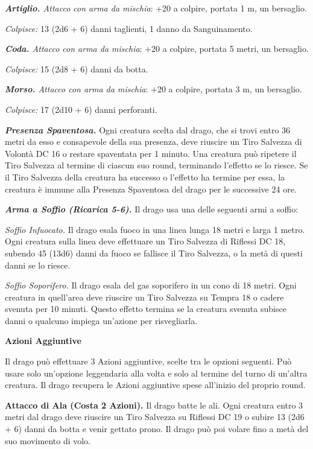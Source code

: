 \begin{multicols}{2}
\textit{\textbf{Artiglio.} Attacco con arma da mischia}: +20 a colpire, portata 1 m, un bersaglio.

\textit{Colpisce:} 13 (2d6 + 6) danni taglienti, 1 danno da Sanguinamento.

\textit{\textbf{Coda.} Attacco con arma da mischia}: +20 a colpire, portata 5 metri, un bersaglio.

\textit{Colpisce:} 15 (2d8 + 6) danni da botta.

\textit{\textbf{Morso.} Attacco con arma da mischia}: +20 a colpire, portata 3 m, un bersaglio.

\textit{Colpisce:} 17 (2d10 + 6) danni perforanti.

\textit{\textbf{Presenza Spaventosa.}} Ogni creatura scelta dal drago, che si trovi entro 36 metri da esso e consapevole della sua presenza, deve riuscire un Tiro Salvezza di Volontà DC 16 o restare spaventata per 1 minuto. Una creatura può ripetere il Tiro Salvezza al termine di ciascun suo round, terminando l'effetto se lo riesce. Se il Tiro Salvezza della creatura ha successo o l'effetto ha termine per essa, la creatura è immune alla Presenza Spaventosa del drago per le successive 24 ore.

\textit{\textbf{Arma a Soffio (Ricarica 5-6).}} Il drago usa una delle seguenti armi a soffio:

\textit{Soffio Infuocato.} Il drago esala fuoco in una linea lunga 18 metri e larga 1 metro. Ogni creatura sulla linea deve effettuare un Tiro Salvezza di Riflessi DC 18, subendo 45 (13d6) danni da fuoco se fallisce il Tiro Salvezza, o la metà di questi danni se lo riesce.

\textit{Soffio Soporifero.} Il drago esala del gas soporifero in un cono di 18 metri. Ogni creatura in quell'area deve riuscire un Tiro Salvezza su Tempra 18 o cadere svenuta per 10 minuti. Questo effetto termina se la creatura svenuta subisce danni o qualcuno impiega un'azione per risvegliarla.

\textbf{Azioni Aggiuntive}

Il drago può effettuare 3 Azioni aggiuntive, scelte tra le opzioni seguenti. Può usare solo un'opzione leggendaria alla volta e solo al termine del turno di un'altra creatura. Il drago recupera le Azioni aggiuntive spese all'inizio del proprio round.

\textbf{Attacco di Ala (Costa 2 Azioni).} Il drago batte le ali. Ogni creatura entro 3 metri dal drago deve riuscire un Tiro Salvezza su Riflessi DC 19 o subire 13 (2d6 + 6) danni da botta e venir gettato prono. Il drago può poi volare fino a metà del suo movimento di volo.


\end{multicols}
